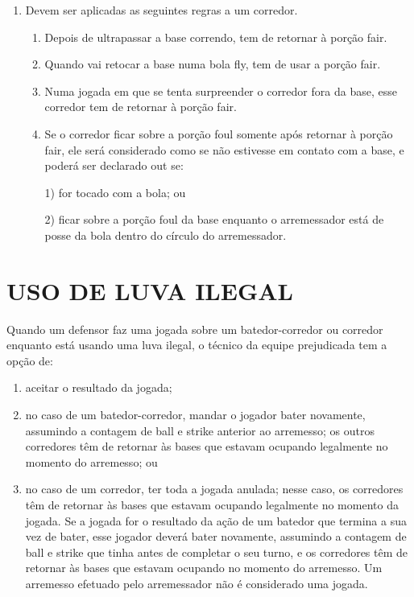 \begin{enumerate}[label=(\alph*)]
	\item  Devem ser aplicadas as seguintes regras a um corredor.

	\begin{enumerate}[label=\roman*.]
	\item Depois de ultrapassar a base correndo, tem de retornar à porção \gls{fair}.
	\item Quando vai retocar a base numa bola \gls{fly}, tem de usar a porção \gls{fair}.
	\item Numa jogada em que se tenta surpreender o corredor fora da base, esse corredor tem de retornar à porção \gls{fair}.
 	\item Se o corredor ficar sobre a porção \gls{foul} somente após retornar à porção \gls{fair}, ele será considerado como se não estivesse em contato com a base,  e poderá ser declarado \gls{out} se:

 1) for tocado com a bola; ou

 2) ficar sobre a porção \gls{foul} da base enquanto o arremessador está de posse da bola dentro do círculo do arremessador.
\end{enumerate}
\end{enumerate}

 \section{USO DE LUVA ILEGAL}

 Quando um defensor faz uma jogada sobre um batedor-corredor ou corredor enquanto está usando uma luva ilegal, o técnico da equipe prejudicada tem a  opção de:
	\begin{enumerate}[label=(\alph*)]\item   aceitar o resultado da jogada;
		\item  no caso de um batedor-corredor, mandar o jogador bater novamente, assumindo a contagem de \gls{ball} e \gls{strike} anterior ao arremesso; os outros corredores têm de retornar às bases que estavam ocupando legalmente no momento do arremesso; ou
		\item  no caso de um corredor, ter toda a jogada anulada; nesse caso, os corredores têm de retornar às bases que estavam ocupando legalmente no momento da  jogada. Se a jogada for o resultado da ação de um batedor que termina a sua  vez de bater, esse jogador deverá bater novamente, assumindo a contagem de \gls{ball} e \gls{strike} que tinha antes de completar o seu turno, e os corredores têm de retornar às bases que estavam ocupando no momento do arremesso. Um arremesso efetuado pelo arremessador não é considerado uma jogada.
	\end{enumerate}

